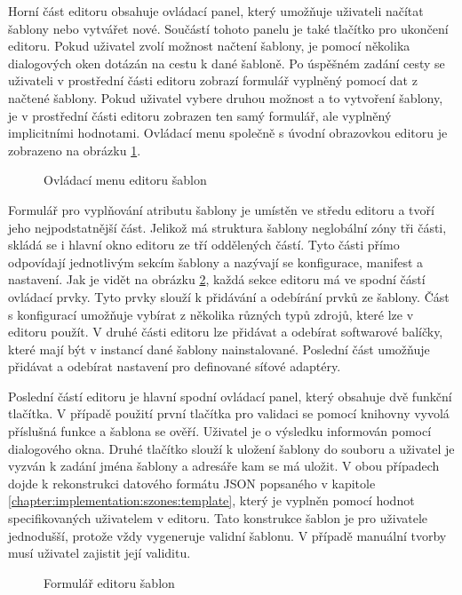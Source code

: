 Horní část editoru obsahuje ovládací panel, který umožňuje uživateli načítat šablony nebo vytvářet nové. Součástí tohoto panelu
je také tlačítko pro ukončení editoru. Pokud uživatel zvolí možnost načtení šablony, je pomocí několika dialogových oken dotázán
na cestu k dané šabloně. Po úspěšném zadání cesty se uživateli v prostřední části editoru zobrazí formulář vyplněný pomocí
dat z načtené šablony. Pokud uživatel vybere druhou možnost a to vytvoření šablony, je v prostřední části editoru zobrazen 
ten samý formulář, ale vyplněný implicitními hodnotami. Ovládací menu společně s úvodní obrazovkou editoru je zobrazeno na 
obrázku \ref{image:implemetation:gui:menu}.
\begin{figure}
    \centering    
    \caption{Ovládací menu editoru šablon}
    \label{image:implemetation:gui:menu}
\end{figure}
Formulář pro vyplňování atributu šablony je umístěn ve středu editoru a tvoří jeho nejpodstatnější část. Jelikož má struktura 
šablony neglobální zóny tři části, skládá se i hlavní okno editoru ze tří oddělených částí. Tyto části přímo odpovídají jednotlivým
sekcím šablony a nazývají se konfigurace, manifest a nastavení. Jak je vidět na obrázku \ref{image:implemetation:gui:form}, každá
sekce editoru má ve spodní částí ovládací prvky. Tyto prvky slouží k přidávání a odebírání prvků ze šablony. Část s konfigurací
umožňuje vybírat z několika různých typů zdrojů, které lze v editoru použít. V druhé části editoru lze přidávat a odebírat
softwarové balíčky, které mají být v instancí dané šablony nainstalované. Poslední část umožňuje přidávat a odebírat nastavení
pro definované síťové adaptéry.

Poslední částí editoru je hlavní spodní ovládací panel, který obsahuje dvě funkční tlačítka. V případě použití první tlačítka
pro validaci se pomocí knihovny vyvolá příslušná funkce a šablona se ověří. Uživatel je o výsledku informován pomocí dialogového
okna. Druhé tlačítko slouží k uložení šablony do souboru a uživatel je vyzván k zadání jména šablony a adresáře kam se má uložit.
V obou případech dojde k rekonstrukci datového formátu JSON popsaného v kapitole \ref{chapter:implementation:szones:template},
který je vyplněn pomocí hodnot specifikovaných uživatelem v editoru. Tato konstrukce šablon je pro uživatele jednodušší, protože
vždy vygeneruje validní šablonu. V případě manuální tvorby musí uživatel zajistit její validitu.
\begin{figure}
    \centering    
    \caption{Formulář editoru šablon}
    \label{image:implemetation:gui:form}
\end{figure}
